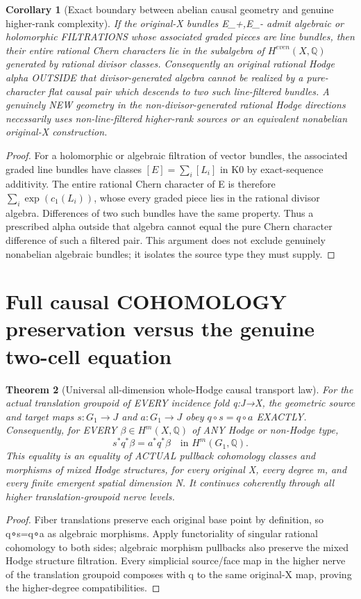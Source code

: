 \documentclass[11pt]{article}
\newtheorem{theorem}{Theorem}
\newtheorem{corollary}[theorem]{Corollary}
\begin{document}
\begin{corollary}[Exact boundary between abelian causal geometry and genuine higher-rank complexity]
If the original-X bundles E_+,E_-
admit algebraic or holomorphic
FILTRATIONS whose associated
graded pieces are line bundles,
then their entire rational Chern
characters lie in the
subalgebra of $H^{even}(X,\mathbb Q)$
generated by rational divisor classes.
Consequently an original rational
Hodge alpha OUTSIDE that
divisor-generated algebra cannot
be realized by a pure-character
flat causal pair which descends
to two such line-filtered bundles.
A genuinely NEW geometry in the
non-divisor-generated rational
Hodge directions necessarily
uses non-line-filtered higher-rank
sources or an equivalent
nonabelian original-X construction.
\end{corollary}
\begin{proof}
For a holomorphic or algebraic
filtration of vector bundles,
the associated graded line
bundles have classes
$[E]=\sum_i[L_i]$ in K0
by exact-sequence additivity.
The entire rational Chern
character of E is therefore
$\sum_i\exp(c_1(L_i))$,
whose every graded piece lies
in the rational divisor algebra.
Differences of two such bundles
have the same property.
Thus a prescribed alpha
outside that algebra cannot
equal the pure Chern character
difference of such a filtered
pair. This argument does not
exclude genuinely nonabelian
algebraic bundles; it isolates
the source type they must supply.
\end{proof}

\section{Full causal COHOMOLOGY preservation versus the genuine two-cell equation}

\begin{theorem}[Universal all-dimension whole-Hodge causal transport law]
For the actual translation groupoid of
EVERY incidence fold q:J→X,
the geometric source and target maps
$s:G_1\to J$ and $a:G_1\to J$
obey
$q\circ s=q\circ a$ EXACTLY.
Consequently, for EVERY
$\beta\in H^m(X,\mathbb Q)$
of ANY Hodge or non-Hodge type,
\[
 \boxed{
   s^*q^*\beta=a^*q^*\beta
        \quad\text{in }H^m(G_1,\mathbb Q).
 }                                                        \tag{28a}
\]
This equality is an equality of
ACTUAL pullback cohomology classes
and morphisms of mixed Hodge
structures, for every original X,
every degree m, and every finite
emergent spatial dimension N.
It continues coherently through
all higher translation-groupoid
nerve levels.
\end{theorem}
\begin{proof}
Fiber translations preserve each
original base point by definition,
so q∘s=q∘a as algebraic
morphisms. Apply functoriality
of singular rational cohomology
to both sides; algebraic
morphism pullbacks also
preserve the mixed Hodge
structure filtration. Every
simplicial source/face map in
the higher nerve of the
translation groupoid composes
with q to the same original-X
map, proving the higher-degree
compatibilities.
\end{proof}
\end{document}

